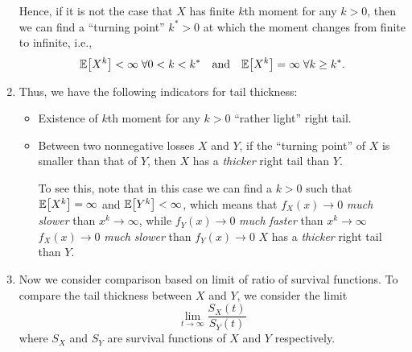\begin{enumerate}
Hence, if it is not the case that \(X\) has finite \(k\)th moment for any
\(k>0\), then we can find a ``turning point'' \(k^*>0\) at which the moment
changes from finite to infinite, i.e.,
\[
\expv{X^k}<\infty\;\forall 0<k< k^*\qqtext{and}
\expv{X^k}=\infty\;\forall k\ge k^*.
\]
\begin{center}
\end{center}
\item Thus, we have the following indicators for tail thickness:
\begin{itemize}
\item Existence of \(k\)th moment for any \(k>0\)  ``rather light'' right tail.
\item Between two nonnegative losses \(X\) and \(Y\), if the ``turning point''
of \(X\) is smaller than that of \(Y\), then \(X\) has a \emph{thicker} right
tail than \(Y\). \begin{note}
To see this, note that in this case we can find a \(k>0\) such that
\(\mathbb{E}\qty[X^k]=\infty\) and \(\mathbb{E}\qty[Y^k]<\infty\), which means that \(f_X(x)\to
0\) \emph{much slower} than \(x^k\to\infty\), while \(f_Y(x)\to 0\) \emph{much faster}
than \(x^k\to\infty\)  \(f_X(x)\to 0\) \emph{much slower} than
\(f_Y(x)\to 0\)  \(X\) has a \emph{thicker} right tail than
\(Y\).
\end{note}
\end{itemize}
\item Now we consider comparison based on limit of ratio of survival functions.
To compare the tail thickness between \(X\) and \(Y\), we consider the limit
\[
\lim_{t\to \infty}\frac{S_X(t)}{S_Y(t)}
\]
where \(S_X\) and \(S_Y\) are survival functions of \(X\) and \(Y\) respectively.


\end{enumerate}
